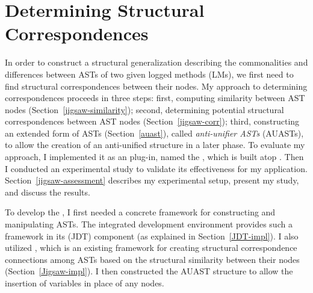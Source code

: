 \chapter{Determining Structural Correspondences}\label{background2}
In order to construct a structural generalization describing the commonalities and differences between ASTs of two given logged methods (LMs), we first need to find structural correspondences between their nodes. My approach to determining correspondences proceeds in three steps: first, computing similarity between AST nodes (Section~\ref{jigsaw-similarity}); second, determining potential structural correspondences between AST nodes (Section~\ref{jigsaw-corr}); third, constructing an extended form of ASTs (Section~\ref{auast}), called \emph{anti-unifier ASTs} (AUASTs), to allow the creation of an anti-unified structure in a later phase. To evaluate my approach, I implemented it as an  plug-in, named the , which is built atop . Then I conducted an experimental study to validate its effectiveness for my application. Section~\ref{jigsaw-assessment} describes my experimental setup, present my study, and discuss the results.

To develop the , I first needed a concrete framework for constructing and manipulating ASTs. The  integrated development environment provides such a framework in its  (JDT) component (as explained in Section~\ref{JDT-impl}). I also utilized  \cite{2008:fse:cottrell}, which is an existing framework for creating structural correspondence connections among ASTs based on the structural similarity between their nodes (Section~\ref{Jigsaw-impl}). I then constructed the AUAST structure to allow the insertion of variables in place of any nodes. 





